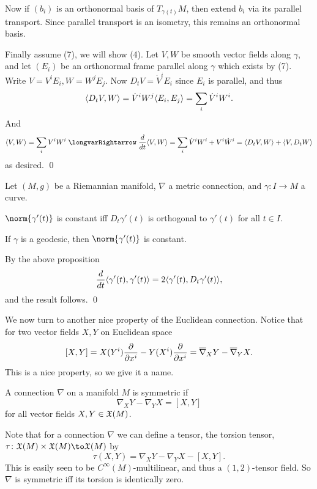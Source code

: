     Now if $(b_i)$ is an orthonormal basis of $T_{\gamma(t)}M$, then extend $b_i$ via its parallel transport.
    Since parallel transport is an isometry, this remains an orthonormal basis.

    Finally assume (7), we will show (4).
    Let $V,W$ be smooth vector fields along $\gamma$, and let $(E_i)$ be an orthonormal frame parallel along $\gamma$ which exists by (7).
    Write $V=V^iE_i,W=W^jE_j$.
    Now $D_tV=\dot V^iE_i$ since $E_i$ is parallel, and thus
    $$ \mathopen{}\mathclose{\left<D_tV,W\right>} = \dot V^iW^j\mathopen{}\mathclose{\left<E_i,E_j\right>} = \sum_i \dot V^iW^i . $$
    And
    $$ \iprod{V,W} = \sum_i V^iW^i \implies \drv t\iprod{V,W} = \sum_i \dot V^iW^i + V^i\dot W^i = \iprod{D_tV,W} + \iprod{V,D_tW} $$
    as desired.
    \qed

\eproof

\bcoro

    Let $(M,g)$ be a Riemannian manifold, $\nabla$ a metric connection, and $\gamma\colon I\to M$ a curve.
    \benum
        \item $\norm{\gamma'(t)}$ is constant iff $D_t\gamma'(t)$ is orthogonal to $\gamma'(t)$ for all $t\in I$.
        \item If $\gamma$ is a geodesic, then $\norm{\gamma'(t)}$ is constant.
    \eenum

\ecoro

\bproof

    By the above proposition
    $$ {{d}\over{dt}}\mathopen{}\mathclose{\left<\gamma'(t),\gamma'(t)\right>} = 2\mathopen{}\mathclose{\left<\gamma'(t),D_t\gamma'(t)\right>} , $$
    and the result follows.
    \qed

\eproof

We now turn to another nice property of the Euclidean connection.
Notice that for two vector fields $X,Y$ on Euclidean space
$$ [X,Y] = X(Y^i){{\partial }\over{\partial x^i}} - Y(X^i){{\partial }\over{\partial x^i}} = \overline\nabla_XY - \overline\nabla_YX . $$
This is a nice property, so we give it a name.

\bdefn

    A connection $\nabla$ on a manifold $M$ is {\emphcolor symmetric} if
    $$ \nabla_XY - \nabla_YX = [X,Y] $$
    for all vector fields $X,Y\in{\frak X}(M)$.

\edefn

Note that for a connection $\nabla$ we can define a tensor, the {\emphcolor torsion tensor}, $\tau\colon\X(M)\times\X(M)\to\X(M)$ by
$$ \tau(X,Y) = \nabla_XY - \nabla_YX - [X,Y] . $$
This is easily seen to be $C^\infty(M)$-multilinear, and thus a $(1,2)$-tensor field.
So $\nabla$ is symmetric iff its torsion is identically zero.

